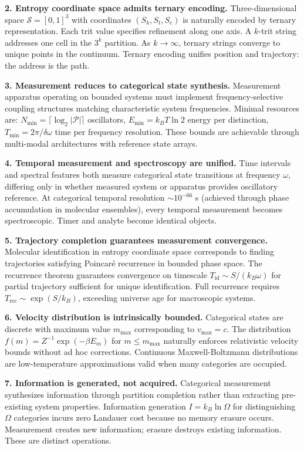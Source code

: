 \documentclass[11pt,a4paper]{article}
\theoremstyle{remark}
\newcommand{\Sk}{S_k}
\newcommand{\St}{S_t}
\newcommand{\Se}{S_e}
\newcommand{\Sspace}{\mathcal{S}}
\newcommand{\partition}{\mathcal{P}}
\begin{document}
\textbf{2. Entropy coordinate space admits ternary encoding.} Three-dimensional space $\Sspace = [0,1]^3$ with coordinates $(\Sk, \St, \Se)$ is naturally encoded by ternary representation. Each trit value specifies refinement along one axis. A $k$-trit string addresses one cell in the $3^k$ partition. As $k \to \infty$, ternary strings converge to unique points in the continuum. Ternary encoding unifies position and trajectory: the address is the path.

\textbf{3. Measurement reduces to categorical state synthesis.} Measurement apparatus operating on bounded systems must implement frequency-selective coupling structures matching characteristic system frequencies. Minimal resources are: $N_{\min} = \lceil \log_2 |\partition| \rceil$ oscillators, $E_{\min} = k_B T \ln 2$ energy per distinction, $T_{\min} = 2\pi/\delta\omega$ time per frequency resolution. These bounds are achievable through multi-modal architectures with reference state arrays.

\textbf{4. Temporal measurement and spectroscopy are unified.} Time intervals and spectral features both measure categorical state transitions at frequency $\omega$, differing only in whether measured system or apparatus provides oscillatory reference. At categorical temporal resolution $\sim 10^{-66}$ s (achieved through phase accumulation in molecular ensembles), every temporal measurement becomes spectroscopic. Timer and analyte become identical objects.

\textbf{5. Trajectory completion guarantees measurement convergence.} Molecular identification in entropy coordinate space corresponds to finding trajectories satisfying Poincaré recurrence in bounded phase space. The recurrence theorem guarantees convergence on timescale $T_{\text{id}} \sim S/(k_B \omega)$ for partial trajectory sufficient for unique identification. Full recurrence requires $T_{\text{rec}} \sim \exp(S/k_B)$, exceeding universe age for macroscopic systems.

\textbf{6. Velocity distribution is intrinsically bounded.} Categorical states are discrete with maximum value $m_{\max}$ corresponding to $v_{\max} = c$. The distribution $f(m) = Z^{-1}\exp(-\beta E_m)$ for $m \leq m_{\max}$ naturally enforces relativistic velocity bounds without ad hoc corrections. Continuous Maxwell-Boltzmann distributions are low-temperature approximations valid when many categories are occupied.

\textbf{7. Information is generated, not acquired.} Categorical measurement synthesizes information through partition completion rather than extracting pre-existing system properties. Information generation $I = k_B \ln \Omega$ for distinguishing $\Omega$ categories incurs zero Landauer cost because no memory erasure occurs. Measurement creates new information; erasure destroys existing information. These are distinct operations.
\end{document}
